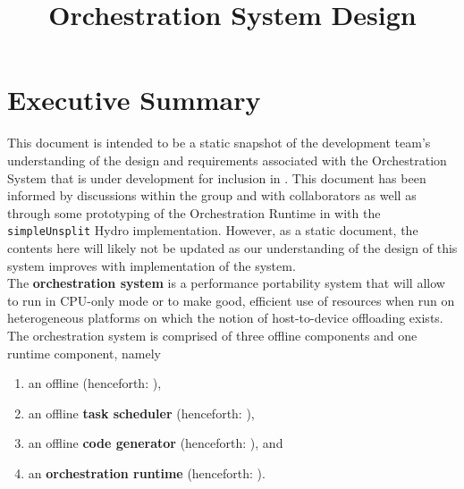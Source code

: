 \documentclass{article}
\title{\FlashOfTheFuture Orchestration System Design}
\begin{document}
\lstset{language=[08]Fortran,frame=single,numbers=left,numberstyle=\scriptsize,basicstyle=\small,
captionpos=b}

\theoremstyle{definition} %
\newtheorem{req}{Req}[section]
\newtheorem{spec}{Spec}[section]

\maketitle

\tableofcontents

\section{Executive Summary}


This document is intended to be a static snapshot of the \FlashOfTheFuture development
team's understanding of the design and requirements associated with the
Orchestration System that is under development for inclusion in \FlashOfTheFuture.  This
document has been informed by discussions within the group and with
collaborators as well as through some prototyping of the Orchestration Runtime
in \FlashOfTheFuture with the \texttt{simpleUnsplit} Hydro implementation.  However, as a
static document, the contents here will likely not be updated as our
understanding of the design of this system improves with implementation of the
system.\\

The \textbf{orchestration system} is a performance portability system that will
allow \FlashOfTheFuture to run in CPU-only mode or to make good, efficient use of resources
when run on heterogeneous platforms on which the notion of host-to-device
offloading exists. The orchestration system is comprised of
three offline components and one runtime component, namely
\begin{enumerate}
\item{an offline \textbf{\spelledoutKGC} (henceforth: \textbf{\shortKGC}),}
\item{an offline \textbf{task scheduler} (henceforth: \textbf{\shortTS}),}
\item{an offline \textbf{code generator} (henceforth: \textbf{\shortCG}), and}
\item{an \textbf{orchestration runtime} (henceforth: \textbf{\shortOR}).}
\end{enumerate}
\end{document}
